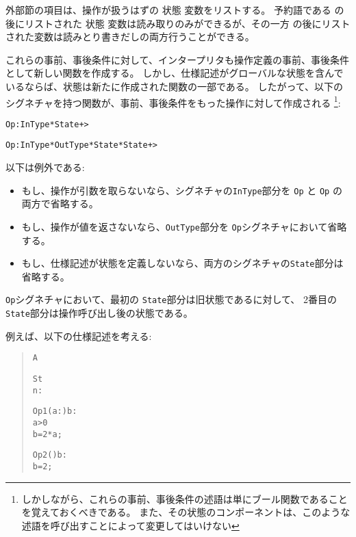 \documentclass[\pformat,12pt]{jarticle}
\begin{document}
\begin{description}
外部節の項目は、操作が扱うはずの
状態
変数をリストする。
予約語である  の後にリストされた
状態
変数は読み取りのみができるが、その一方 の後にリストされた変数は読みとり書きだしの両方行うことができる。
 
これらの事前、事後条件に対して、インタープリタも操作定義の事前、事後条件として新しい関数を作成する。
しかし、仕様記述がグローバルな状態を含んでいるならば、状態は新たに作成された関数の一部である。 
したがって、以下のシグネチャを持つ関数が、事前、事後条件をもった操作に対して作成される
\footnote{しかしながら、これらの事前、事後条件の述語は単にブール関数であることを覚えておくべきである。
また、その状態のコンポーネントは、このような述語を呼び出すことによって変更してはいけない}:
\begin{alltt}
  Op : InType * State +> 

  Op : InType * OutType * State * State +> 
\end{alltt}
以下は例外である:
\begin{itemize}
\item もし、操作が引数を取らないなら、シグネチャの{\tt InType}部分を {\tt {}Op} と {\tt {}Op}
の両方で省略する。

\item もし、操作が値を返さないなら、{\tt OutType}部分を {\tt {}Op}シグネチャにおいて省略する。

\item もし、仕様記述が状態を定義しないなら、両方のシグネチャの{\tt State}部分は省略する。

\end{itemize}

{\tt {}Op}シグネチャにおいて、最初の {\tt State}部分は旧状態であるに対して、
2番目の {\tt State}部分は操作呼び出し後の状態である。

例えば、以下の仕様記述を考える:

\begin{quotation}
\begin{minipage}[t]{.4\textwidth}
\begin{alltt}
 A


 St 
  n : 


Op1 (a : ) b :
 a > 0
 b = 2 * a;

Op2 () b : 
 b = 2;


\end{alltt}
\end{minipage}
\end{quotation}
\end{description}
\end{document}

